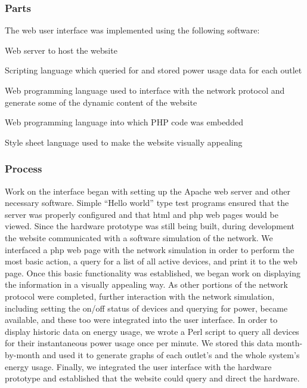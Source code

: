 \documentclass[12pt]{article}
\begin{document}
\subsubsection{Parts}
The web user interface was implemented using the following software:
\begin{description}
  \setlength{\itemsep}{0pt}
  \setlength{\parskip}{0pt}
  \setlength{\parsep}{0pt}
\item[Apache2:] Web server to host the website
\item[Perl:] Scripting language which queried for and stored power usage
  data for each outlet
\item[PHP5:] Web programming language used to interface with the network
  protocol and generate some of the dynamic content of the website
\item[HTML:] Web programming language into which PHP code was embedded
\item[CSS:] Style sheet language used to make the website visually appealing
\end{description}

\subsubsection{Process}
Work on the interface began with setting up the Apache web server
and other necessary software. Simple “Hello world” type test
programs ensured that the server was properly configured and that
html and php web pages would be viewed. Since the hardware
prototype was still being built, during development the website
communicated with a software simulation of the network. We
interfaced a php web page with the network simulation in order to
perform the most basic action, a query for a list of all active
devices, and print it to the web page. Once this basic
functionality was established, we began work on displaying the
information in a visually appealing way. As other portions of the
network protocol were completed, further interaction with the
network simulation, including setting the on/off status of
devices and querying for power, became available, and these too
were integrated into the user interface. In order to display
historic data on energy usage, we wrote a Perl script to query
all devices for their instantaneous power usage once per
minute. We stored this data month-by-month and used it to
generate graphs of each outlet’s and the whole system’s energy
usage. Finally, we integrated the user interface with the
hardware prototype and established that the website could query
and direct the hardware.
\end{document}
